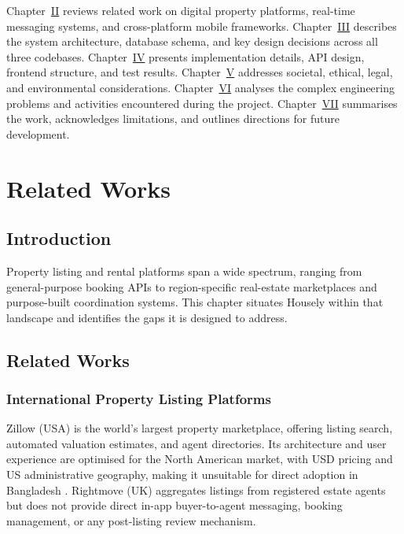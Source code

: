 \documentclass[12pt,a4paper]{report}
\begin{document}
Chapter~\hyperref[chap:related]{II} reviews related work on digital property platforms,
real-time messaging systems, and cross-platform mobile frameworks.
Chapter~\hyperref[chap:design]{III} describes the system architecture, database schema,
and key design decisions across all three codebases.
Chapter~\hyperref[chap:impl]{IV} presents implementation details, API design, frontend
structure, and test results.
Chapter~\hyperref[chap:societal]{V} addresses societal, ethical, legal, and environmental
considerations.
Chapter~\hyperref[chap:complex]{VI} analyses the complex engineering problems and
activities encountered during the project.
Chapter~\hyperref[chap:conc]{VII} summarises the work, acknowledges limitations, and
outlines directions for future development.

\chapter{Related Works}
\label{chap:related}

\section{Introduction}

Property listing and rental platforms span a wide spectrum, ranging from general-purpose
booking APIs to region-specific real-estate marketplaces and purpose-built coordination
systems. This chapter situates Housely within that landscape and identifies the gaps it
is designed to address.

\section{Related Works}

\subsection{International Property Listing Platforms}

Zillow (USA) is the world's largest property marketplace, offering listing search, automated
valuation estimates, and agent directories. Its architecture and user experience are
optimised for the North American market, with USD pricing and US administrative
geography, making it unsuitable for direct adoption in Bangladesh \cite{zillow2023}.
Rightmove (UK) aggregates listings from registered estate agents but does not provide
direct in-app buyer-to-agent messaging, booking management, or any post-listing review
mechanism.
\end{document}
